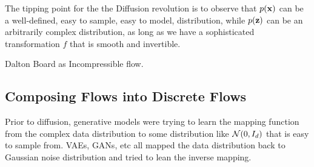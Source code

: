 \documentclass[a4paper, 11pt]{article}
\begin{document}
\begin{center} 
\end{center} 


The tipping point for the the Diffusion revolution is to observe that $p(\mbox{$\mbox{$\mathbf{x}$}$})$ can be a well-defined, easy to sample, easy to model, distribution, while $p(\mbox{$\mbox{$\mathbf{z}$}$})$ can be an arbitrarily complex distribution, as long as we have a sophisticated transformation $f$ that is smooth and invertible.


Dalton Board as Incompressible flow.


\subsection{Composing Flows into Discrete Flows}
Prior to diffusion, generative models were trying to learn the mapping function from the complex data distribution to some distribution like $\mbox{$\cal N$}(0, I_d)$ that is easy to sample from. VAEs, GANs, etc all mapped the data distribution back to Gaussian noise distribution and tried to lean the inverse mapping. 
\end{document}

